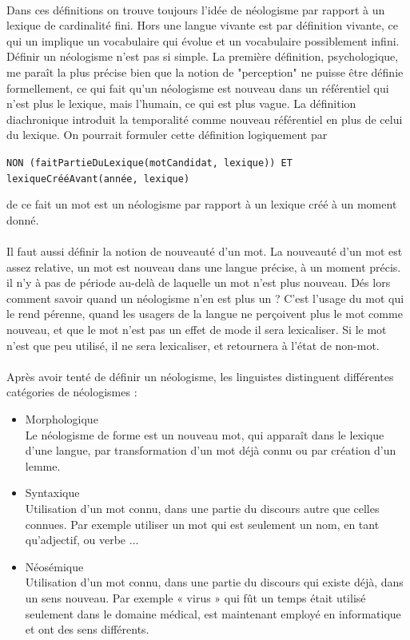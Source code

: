\documentclass{article}
\begin{document}
\paragraph*{}
Dans ces définitions on trouve toujours l'idée de néologisme par rapport à un lexique de cardinalité fini. Hors une langue vivante est par définition vivante, ce qui un implique un vocabulaire qui évolue et un vocabulaire possiblement infini. Définir un néologisme n'est pas si simple. La première définition, psychologique, me paraît la plus précise bien que la notion de "perception" ne puisse être définie formellement, ce qui fait qu'un néologisme est nouveau dans un référentiel qui n'est plus le lexique, mais l'humain, ce qui est plus vague. La définition diachronique introduit la temporalité comme nouveau référentiel en plus de celui du lexique. On pourrait formuler cette définition logiquement par
\begin{center}
\texttt{NON (faitPartieDuLexique(motCandidat, lexique))\newline
ET lexiqueCrééAvant(année, lexique)}
\end{center}
de ce fait un mot est un néologisme par rapport à un lexique créé à un moment donné.
\paragraph*{}
Il faut aussi définir la notion de nouveauté d'un mot. La nouveauté d'un mot est assez relative, un mot est nouveau dans une langue précise, à un moment précis. il n'y à pas de période au-delà de laquelle un mot n'est plus nouveau. Dés lors comment savoir quand un néologisme n'en est plus un ? C'est l'usage du mot qui le rend pérenne, quand les usagers de la langue ne perçoivent plus le mot comme nouveau, et que le mot n'est pas un effet de mode il sera lexicaliser. Si le mot n'est que peu utilisé, il ne sera lexicaliser, et retournera à l'état de non-mot.
\paragraph*{}
Après avoir tenté de définir un néologisme, les linguistes distinguent différentes catégories de néologismes :
\begin{itemize}
	\item Morphologique\\
	Le néologisme de forme est un nouveau mot, qui apparaît dans le lexique d'une langue, par transformation d'un mot déjà connu ou par création d'un lemme.
	\item Syntaxique\\
	Utilisation d'un mot connu, dans une partie du discours autre que celles connues. Par exemple utiliser un mot qui est seulement un nom, en tant qu'adjectif, ou verbe ...
	\item Néosémique\\
	Utilisation d'un mot connu, dans une partie du discours qui existe déjà, dans un sens nouveau. Par exemple « virus » qui fût un temps était utilisé seulement dans le domaine médical, est maintenant employé en informatique et ont des sens différents.
\end{itemize}
\end{document}
